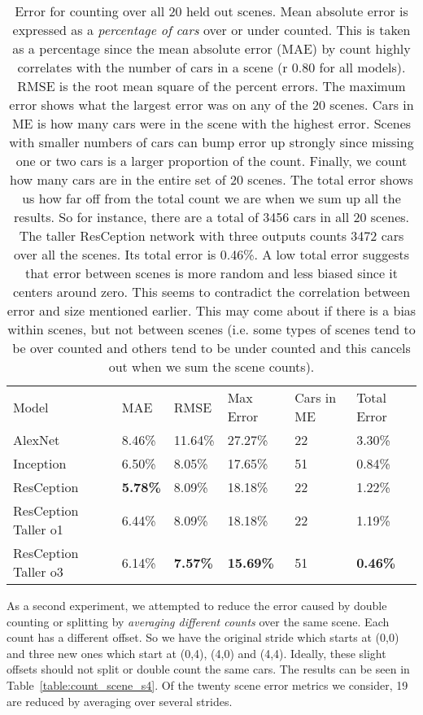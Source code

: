 \documentclass[runningheads]{llncs}
\begin{document}
\setlength{\tabcolsep}{4pt}
\begin{table}
\begin{center}
\caption{Error for counting over all 20 held out scenes. Mean absolute error is expressed as a {\it percentage of cars} over or under counted. This is taken as a percentage since the mean absolute error (MAE) by count highly correlates with the number of cars in a scene (r  0.80 for all models). RMSE is the root mean square of the percent errors. The maximum error shows what the largest error was on any of the 20 scenes. Cars in ME is how many cars were in the scene with the highest error. Scenes with smaller numbers of cars can bump error up strongly since missing one or two cars is a larger proportion of the count. Finally, we count how many cars are in the entire set of 20 scenes. The total error shows us how far off from the total count we are when we sum up all the results. So for instance, there are a total of 3456 cars in all 20 scenes. The taller ResCeption network with three outputs counts 3472 cars over all the scenes. Its total error is 0.46\%. A low total error suggests that error between scenes is more random and less biased since it centers around zero. This seems to contradict the correlation between error and size mentioned earlier. This may come about if there is a bias within scenes, but not between scenes (i.e. some types of scenes tend to be over counted and others tend to be under counted and this cancels out when we sum the scene counts). }
\label{table:count_scene_s1}
\begin{tabular}{llllll}
\hline\noalign{\smallskip}
Model & MAE & RMSE & Max Error & Cars in ME & Total Error\\
\noalign{\smallskip}
\hline
\noalign{\smallskip}
AlexNet & 8.46\% & 11.64\% & 27.27\% & 22 & 3.30\%\\
Inception & 6.50\% & 8.05\% & 17.65\% & 51 & 0.84\%\\
ResCeption & {\bf 5.78\%} & 8.09\% & 18.18\% & 22 & 1.22\%\\
ResCeption Taller o1 & 6.44\% & 8.09\% & 18.18\% & 22 & 1.19\%\\
ResCeption Taller o3 & 6.14\% & {\bf 7.57\%} & {\bf 15.69\%} & 51 & {\bf0.46\%}\\
\hline
\end{tabular}
\end{center}
\end{table}
\setlength{\tabcolsep}{1.4pt}

As a second experiment, we attempted to reduce the error caused by double counting or splitting by {\it averaging different counts} over the same scene. Each count has a different offset. So we have the original stride which starts at (0,0) and three new ones which start at (0,4), (4,0) and (4,4). Ideally, these slight offsets should not split or double count the same cars. The results can be seen in Table~\ref{table:count_scene_s4}. Of the twenty scene error metrics we consider, 19 are reduced by averaging over several strides. 
\end{document}
